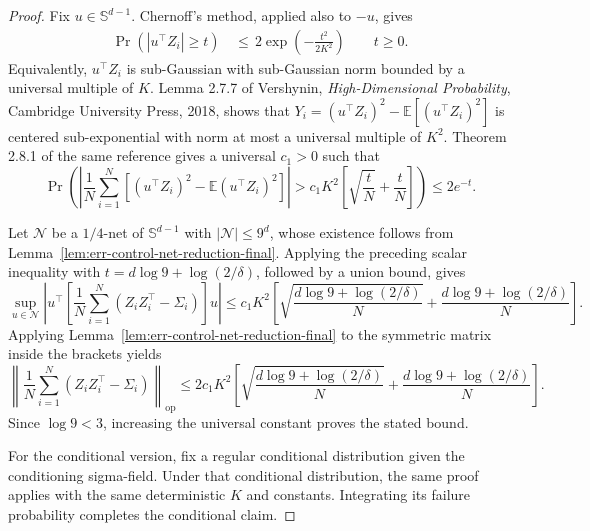\documentclass{article} %
\begin{document}
\begin{proof}
Fix \(u\in\mathbb S^{d-1}\). Chernoff's method, applied also to \(-u\),
gives
\begin{equation}
\begin{aligned}
\Pr(|u^\top Z_i|\ge t)
&\,\leq\,
2\exp\!\left(-\frac{t^2}{2K^2}\right)
\qquad t\ge0.
\end{aligned}
\end{equation}
Equivalently, \(u^\top Z_i\) is sub-Gaussian with sub-Gaussian norm bounded by
a universal multiple of \(K\). Lemma 2.7.7 of Vershynin,
\emph{High-Dimensional Probability}, Cambridge University Press, 2018, shows
that \(Y_i=(u^\top Z_i)^2-\mathbb E[(u^\top Z_i)^2]\) is centered
sub-exponential with norm at most a universal multiple of \(K^2\).
Theorem 2.8.1 of the same reference gives a universal \(c_1>0\) such that
\begin{equation}
\Pr\!\left(
\left|
\frac1N\sum_{i=1}^N
\left[
(u^\top Z_i)^2-\mathbb{E}(u^\top Z_i)^2
\right]
\right|
>
c_1K^2
\left[
\sqrt{\frac{t}{N}}+\frac{t}{N}
\right]
\right)
\leq
2e^{-t}.
\end{equation}

Let \(\mathcal{N}\) be a \(1/4\)-net of \(\mathbb{S}^{d-1}\) with
\(|\mathcal{N}|\le 9^d\), whose existence follows from
Lemma~\ref{lem:err-control-net-reduction-final}.  Applying the preceding scalar
inequality with \(t=d\log9+\log(2/\delta)\), followed by a union bound, gives
\begin{equation}
\sup_{u\in\mathcal{N}}
\left|
u^\top
\left[
\frac1N\sum_{i=1}^N
\left(Z_iZ_i^\top-\Sigma_i\right)
\right]
u
\right|
\leq
c_1K^2
\left[
\sqrt{\frac{d\log 9+\log(2/\delta)}{N}}
+
\frac{d\log 9+\log(2/\delta)}{N}
\right].
\end{equation}
Applying Lemma~\ref{lem:err-control-net-reduction-final} to the symmetric matrix
inside the brackets yields
\begin{equation}
\left\|
\frac1N\sum_{i=1}^N
\left(Z_iZ_i^\top-\Sigma_i\right)
\right\|_{\mathrm{op}}
\leq
2c_1K^2
\left[
\sqrt{\frac{d\log 9+\log(2/\delta)}{N}}
+
\frac{d\log 9+\log(2/\delta)}{N}
\right].
\end{equation}
Since \(\log 9<3\), increasing the universal constant proves the stated bound.

For the conditional version, fix a regular conditional distribution given the
conditioning sigma-field.  Under that conditional distribution, the same proof
applies with the same deterministic \(K\) and constants. Integrating its
failure probability completes the conditional claim.
\end{proof}
\end{document}
